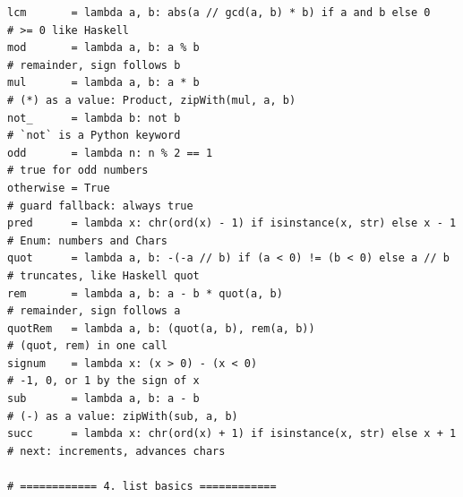 \documentclass[10pt,letterpaper]{book}
\begin{document}
\begin{lstlisting}[style=file]
lcm       = lambda a, b: abs(a // gcd(a, b) * b) if a and b else 0       # >= 0 like Haskell
mod       = lambda a, b: a % b                                           # remainder, sign follows b
mul       = lambda a, b: a * b                                           # (*) as a value: Product, zipWith(mul, a, b)
not_      = lambda b: not b                                              # `not` is a Python keyword
odd       = lambda n: n % 2 == 1                                         # true for odd numbers
otherwise = True                                                        # guard fallback: always true
pred      = lambda x: chr(ord(x) - 1) if isinstance(x, str) else x - 1   # Enum: numbers and Chars
quot      = lambda a, b: -(-a // b) if (a < 0) != (b < 0) else a // b    # truncates, like Haskell quot
rem       = lambda a, b: a - b * quot(a, b)                              # remainder, sign follows a
quotRem   = lambda a, b: (quot(a, b), rem(a, b))                         # (quot, rem) in one call
signum    = lambda x: (x > 0) - (x < 0)                                  # -1, 0, or 1 by the sign of x
sub       = lambda a, b: a - b                                           # (-) as a value: zipWith(sub, a, b)
succ      = lambda x: chr(ord(x) + 1) if isinstance(x, str) else x + 1   # next: increments, advances chars

# ============ 4. list basics ============


\end{lstlisting}
\end{document}
